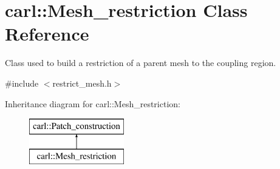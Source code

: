 \hypertarget{classcarl_1_1_mesh__restriction}{}\section{carl\+:\+:Mesh\+\_\+restriction Class Reference}
\label{classcarl_1_1_mesh__restriction}


Class used to build a restriction of a parent mesh to the coupling region.  




{\ttfamily \#include $<$restrict\+\_\+mesh.\+h$>$}

Inheritance diagram for carl\+:\+:Mesh\+\_\+restriction\+:\begin{figure}[H]
\begin{center}
\leavevmode
\includegraphics[height=2.000000cm]{classcarl_1_1_mesh__restriction}
\end{center}
\end{figure}
